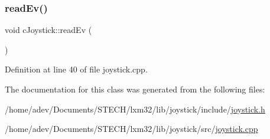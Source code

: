\subsubsection{\texorpdfstring{read\+Ev()}{readEv()}}
{\footnotesize\ttfamily void c\+Joystick\+::read\+Ev (\begin{DoxyParamCaption}{ }\end{DoxyParamCaption})}



Definition at line 40 of file joystick.\+cpp.



The documentation for this class was generated from the following files\+:\begin{DoxyCompactItemize}
\item 
/home/adev/\+Documents/\+S\+T\+E\+C\+H/lxm32/lib/joystick/include/\hyperlink{joystick_8h}{joystick.\+h}\item 
/home/adev/\+Documents/\+S\+T\+E\+C\+H/lxm32/lib/joystick/src/\hyperlink{joystick_8cpp}{joystick.\+cpp}\end{DoxyCompactItemize}
